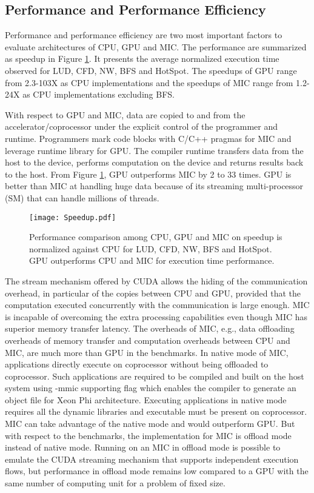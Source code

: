\subsection{Performance and Performance Efficiency}
Performance and performance efficiency are two most important factors to evaluate architectures of CPU, GPU and MIC. The performance are summarized as speedup in Figure \ref{fig:speedup}. It presents the average normalized execution time observed for LUD, CFD, NW, BFS and HotSpot. The speedups of GPU range from 2.3-103X as CPU implementations and the speedups of MIC range from 1.2-24X as CPU implementations excluding BFS.

With respect to GPU and MIC, data are copied to and from the accelerator/coprocessor under the explicit control of the programmer and runtime. Programmers mark code blocks with C/C++ pragmas for MIC and leverage runtime library for GPU. The compiler runtime transfers data from the host to the device, performs computation on the device and returns results back to the host. From Figure \ref{fig:speedup}, GPU outperforms MIC by 2 to 33 times. GPU is better than MIC at handling huge data because of its streaming multi-processor (SM) that can handle millions of threads.  

    \begin{figure}[h!]
  \centering
  \begin{minipage}{0.5\textwidth}
    \centering
   \centering
     \texttt{[image: Speedup.pdf]}    
\caption{Performance comparison among CPU, GPU and MIC on speedup is normalized against CPU for LUD, CFD, NW, BFS and HotSpot. GPU outperforms CPU and MIC for execution time performance.}

\label{fig:speedup}
\end{minipage}%
\end{figure}

The stream mechanism offered by CUDA allows the hiding of the communication overhead, in particular of the copies between CPU and GPU, provided that the computation executed concurrently with the communication is large enough. MIC is incapable of overcoming the extra processing capabilities even though MIC has superior memory transfer latency. The overheads of MIC, e.g., data offloading overheads of memory transfer and computation overheads between CPU and MIC, are much more than GPU in the benchmarks. In native mode of MIC, applications directly execute on coprocessor without being offloaded to coprocessor. Such applications are required to be compiled and built on the host system using -mmic supporting flag which enables the compiler to generate an object file for Xeon Phi architecture. Executing applications in native mode requires all the dynamic libraries and executable must be present on coprocessor. MIC can take advantage of the native mode and would outperform GPU. But with respect to the benchmarks, the implementation for MIC is offload mode instead of native mode. Running on an MIC in offload mode is possible to emulate the CUDA streaming mechanism that supports independent execution flows, but performance in offload mode remains low compared to a GPU with the same number of computing unit for a problem of fixed size. 

